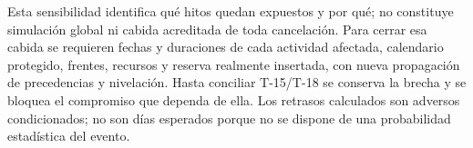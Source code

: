 Esta sensibilidad identifica qué hitos quedan expuestos y por qué; no constituye simulación global ni cabida acreditada de toda cancelación. Para cerrar esa cabida se requieren fechas y duraciones de cada actividad afectada, calendario protegido, frentes, recursos y reserva realmente insertada, con nueva propagación de precedencias y nivelación. Hasta conciliar T-15/T-18 se conserva la brecha y se bloquea el compromiso que dependa de ella. Los retrasos calculados son adversos condicionados; no son días esperados porque no se dispone de una probabilidad estadística del evento. \parencites[art.~17; pp.~12--13]{sd8-ba}[cap.~10, restricción 12; numeral 17.5; cap.~19]{sd8-c07}
